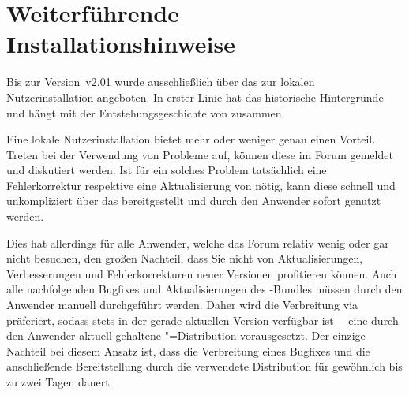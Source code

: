 \chapter{Weiterführende Installationshinweise}
%
%
\noindent{}

\bigskip\noindent
Bis zur Version~v2.01 wurde \TUDScript ausschließlich über das \Forum zur 
lokalen Nutzerinstallation angeboten. In erster Linie hat das historische 
Hintergründe und hängt mit der Entstehungsgeschichte von \TUDScript zusammen. 

Eine lokale Nutzerinstallation bietet mehr oder weniger genau einen Vorteil. 
Treten bei der Verwendung von \TUDScript Probleme auf, können diese im Forum 
gemeldet und diskutiert werden. Ist für ein solches Problem tatsächlich eine 
Fehlerkorrektur respektive eine Aktualisierung von \TUDScript nötig, kann 
diese schnell und unkompliziert über das \GitHubRepo bereitgestellt und durch 
den Anwender sofort genutzt werden.

Dies hat allerdings für alle Anwender, welche das Forum relativ wenig oder gar 
nicht besuchen, den großen Nachteil, dass Sie nicht von Aktualisierungen, 
Verbesserungen und Fehlerkorrekturen neuer Versionen profitieren können. Auch 
alle nachfolgenden Bugfixes und Aktualisierungen des \TUDScript-Bundles müssen 
durch den Anwender manuell durchgeführt werden. Daher wird die Verbreitung via 
 präferiert, sodass \TUDScript stets in der gerade aktuellen 
Version verfügbar ist~-- eine durch den Anwender aktuell gehaltene 
"=Distribution vorausgesetzt. Der einzige Nachteil bei diesem 
Ansatz ist, dass die Verbreitung eines Bugfixes und die anschließende 
Bereitstellung durch die verwendete Distribution für gewöhnlich bis zu zwei 
Tagen dauert.

